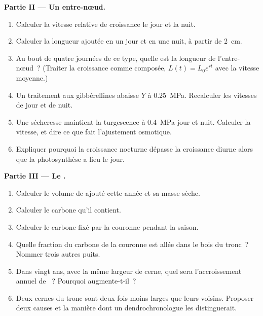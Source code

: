 \begin{problem}
\medskip
\noindent\textbf{Partie II --- Un entre-nœud.}
\begin{enumerate}[resume]
  \item Calculer la vitesse relative de croissance le jour et la nuit.
  \item Calculer la longueur ajoutée en un jour et en une nuit, à partir
        de \qty{2}{cm}.
  \item Au bout de quatre journées de ce type, quelle est la longueur de
        l'entre-nœud~? (Traiter la croissance comme composée,
        $L(t) = L_0 e^{rt}$ avec la vitesse moyenne.)
  \item Un traitement aux gibbérellines abaisse $Y$ à \qty{0.25}{MPa}.
        Recalculer les vitesses de jour et de nuit.
  \item Une sécheresse maintient la turgescence à \qty{0.4}{MPa} jour et
        nuit. Calculer la vitesse, et dire ce que fait l'ajustement
        osmotique.
  \item Expliquer pourquoi la croissance nocturne dépasse la croissance
        diurne alors que la photosynthèse a lieu le jour.
\end{enumerate}

\medskip
\noindent\textbf{Partie III --- Le .}
\begin{enumerate}[resume]
  \item Calculer le volume de  ajouté cette année et sa masse sèche.
  \item Calculer le carbone qu'il contient.
  \item Calculer le carbone fixé par la couronne pendant la saison.
  \item Quelle fraction du carbone de la couronne est allée dans le bois
        du tronc~? Nommer trois autres puits.
  \item Dans vingt ans, avec la même largeur de cerne, quel sera
        l'accroissement annuel de ~? Pourquoi augmente-t-il~?
  \item Deux cernes du tronc sont deux fois moins larges que leurs
        voisins. Proposer deux causes et la manière dont un
        dendrochronologue les distinguerait.
\end{enumerate}


\end{problem}
